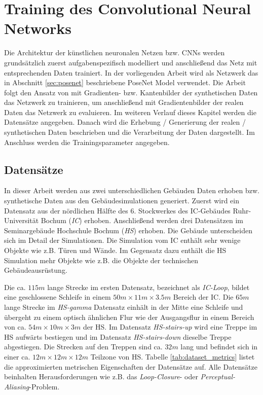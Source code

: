 
\section{Training des Convolutional Neural Networks}
Die Architektur der künstlichen neuronalen Netzen bzw. CNNs werden grundsätzlich zuerst aufgabenspezifisch modelliert und anschließend das Netz mit entsprechenden Daten trainiert.  In der vorliegenden Arbeit wird als Netzwerk das in Abschnitt \ref{sec:posenet} beschriebene PoseNet Model verwendet. Die Arbeit folgt den Ansatz von \citet{acharyaBIMPoseNetIndoorCamera2019} mit Gradienten- bzw. Kantenbilder der synthetischen Daten das Netzwerk zu trainieren, um anschließend mit Gradientenbilder der realen Daten das Netzwerk zu evaluieren. 
Im weiteren Verlauf dieses Kapitel werden die Datensätze angegeben. Danach wird die Erhebung / Generierung der realen / synthetischen Daten beschrieben und die Verarbeitung der Daten dargestellt. Im Anschluss werden die Trainingsparameter angegeben. 

\subsection{Datensätze}
\label{subsec:datasets}
In dieser Arbeit werden aus zwei unterschiedlichen Gebäuden Daten erhoben bzw. synthetische Daten aus den Gebäudesimulationen generiert. 
Zuerst wird ein Datensatz aus der nördlichen Hälfte des 6. Stockwerkes des IC-Gebäudes Ruhr-Universität Bochum (\textit{IC}) erhoben. Anschließend werden drei Datensätzen im Seminargebäude Hochschule Bochum (\textit{HS}) erhoben. Die Gebäude unterscheiden sich im Detail der Simulationen. Die Simulation vom IC enthält sehr wenige Objekte wie z.B. Türen und Wände. Im Gegensatz dazu enthält die HS Simulation mehr Objekte wie z.B. die Objekte der technischen Gebäudeausrüstung.


Die ca. $115m$ lange Strecke im ersten Datensatz, bezeichnet als \textit{IC-Loop}, bildet eine geschlossene Schleife in einem $50m \times 11m \times 3.5m$ Bereich der IC. Die $65m$ lange Strecke im \textit{HS-gamma} Datensatz einhält in der Mitte eine Schleife und übergeht zu einem optisch ähnlichen Flur wie der Ausgangsflur in einem Bereich von ca. $54m \times 10m \times 3m$ der HS. Im Datensatz \textit{HS-stairs-up} wird eine Treppe im HS aufwärts bestiegen und im Datensatz \textit{HS-stairs-down} dieselbe Treppe abgestiegen. Die Strecken auf den Treppen sind  ca. $32m$ lang und befindet sich in einer ca. $12m \times 12m \times 12m$ Teilzone von HS. Tabelle \ref{tab:dataset_metrics} listet die approximierten metrischen Eigenschaften der Datensätze auf.
Alle Datensätze beinhalten Herausforderungen wie z.B. das \textit{Loop-Closure}- oder \textit{Perceptual-Aliasing}-Problem.


